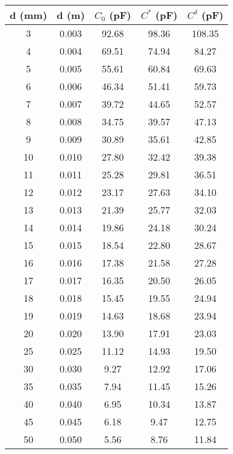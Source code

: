     \begin{adjustbox}{max width=\columnwidth}
    \begin{tabular}{|c|c|c|c|c|}
        \hline
d (mm)	&d (m)	&$C_0$ (pF)	&$C^{*}$ (pF)	&$C^{\delta}$ (pF)\\\hline
3	&0.003	&92.68	&98.36	&108.35\\
4	&0.004	&69.51	&74.94	&84.27\\
5	&0.005	&55.61	&60.84	&69.63\\
6	&0.006	&46.34	&51.41	&59.73\\
7	&0.007	&39.72	&44.65	&52.57\\
8	&0.008	&34.75	&39.57	&47.13\\
9	&0.009	&30.89	&35.61	&42.85\\
10	&0.010	&27.80	&32.42	&39.38\\
11	&0.011	&25.28	&29.81	&36.51\\
12	&0.012	&23.17	&27.63	&34.10\\
13	&0.013	&21.39	&25.77	&32.03\\
14	&0.014	&19.86	&24.18	&30.24\\
15	&0.015	&18.54	&22.80	&28.67\\
16	&0.016	&17.38	&21.58	&27.28\\
17	&0.017	&16.35	&20.50	&26.05\\
18	&0.018	&15.45	&19.55	&24.94\\
19	&0.019	&14.63	&18.68	&23.94\\
20	&0.020	&13.90	&17.91	&23.03\\
25	&0.025	&11.12	&14.93	&19.50\\
30	&0.030	&9.27	&12.92	&17.06\\
35	&0.035	&7.94	&11.45	&15.26\\
40	&0.040	&6.95	&10.34	&13.87\\
45	&0.045	&6.18	&9.47	&12.75\\
50	&0.050	&5.56	&8.76	&11.84\\
    \hline
    \end{tabular}
    \end{adjustbox}